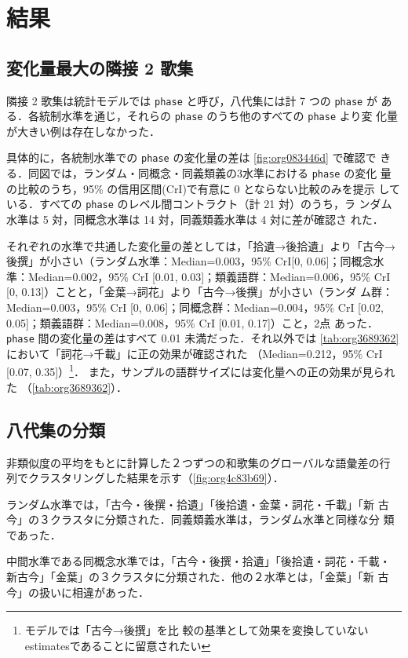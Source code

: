 \documentclass[submit]{ipsj}
\renewcommand{\ref}{\cref}
\begin{document}
\section{結果\label{org32f3782}}
\label{sec:orga0a91da}
\subsection{変化量最大の隣接 2 歌集\label{orgd8cf070}}
\label{sec:org5432394}
隣接 2 歌集は統計モデルでは \texttt{phase} と呼び，八代集には計 7 つの \texttt{phase} が
ある．各統制水準を通じ，それらの \texttt{phase} のうち他のすべての \texttt{phase} より変
化量が大きい例は存在しなかった．

具体的に，各統制水準での \texttt{phase} の変化量の差は \ref{fig:org083446d} で確認で
きる．同図では，ランダム・同概念・同義類義の3水準における \texttt{phase} の変化
量の比較のうち，95\% の信用区間(CrI)で有意に 0 とならない比較のみを提示
している．すべての \texttt{phase} のレベル間コントラクト（計 21 対）のうち，ラ
ンダム水準は 5 対，同概念水準は 14 対，同義類義水準は 4 対に差が確認さ
れた．

それぞれの水準で共通した変化量の差としては，「拾遺→後拾遺」より「古今→
後撰」が小さい（ランダム水準：Median=0.003，95\% CrI[0, 0.06]；同概念水
準：Median=0.002，95\% CrI [0.01, 0.03]；類義語群：Median=0.006，95\%
CrI [0, 0.13]）ことと，「金葉→詞花」より「古今→後撰」が小さい（ランダ
ム群：Median=0.003，95\% CrI [0, 0.06]；同概念群：Median=0.004，95\% CrI
{[}0.02, 0.05]；類義語群：Median=0.008，95\% CrI [0.01, 0.17]）こと，2点
あった． \texttt{phase} 間の変化量の差はすべて 0.01 未満だった．それ以外では
\ref{tab:org3689362} において「詞花→千載」に正の効果が確認された
（Median=0.212，95\% CrI [0.07, 0.35]）\footnote{モデルでは「古今→後撰」を比
較の基準として効果を変換していないestimatesであることに留意されたい}．
また，サンプルの語群サイズには変化量への正の効果が見られた
（\ref{tab:org3689362}）．
\subsection{八代集の分類\label{org36d957e}}
\label{sec:org06438b1}
非類似度の平均をもとに計算した２つずつの和歌集のグローバルな語彙差の行
列でクラスタリングした結果を示す（\ref{fig:org4c83b69}）．

ランダム水準では，「古今・後撰・拾遺」「後拾遺・金葉・詞花・千載」「新
古今」の３クラスタに分類された．同義類義水準は，ランダム水準と同様な分
類であった．

中間水準である同概念水準では，「古今・後撰・拾遺」「後拾遺・詞花・千載・
新古今」「金葉」の３クラスタに分類された．他の２水準とは，「金葉」「新
古今」の扱いに相違があった．
\end{document}
